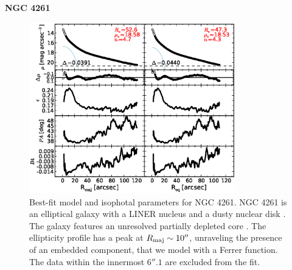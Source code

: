 \documentclass[preprint2]{emulateapj}
\newcommand{\fitfigurewidth}{0.8\textwidth}
\begin{document}
  \clearpage\newpage\noindent
  {\bf NGC 4261 \\}

  \begin{figure}[h]
  \begin{center}
  \includegraphics[width=\fitfigurewidth]{images/n4261_1Dfit.eps}
  \caption{Best-fit model and isophotal parameters for NGC 4261.
  NGC 4261 is an elliptical galaxy with a LINER nucleus \citep{veroncettyveron2006}
  and a dusty nuclear disk \citep{tran2001}.
  The galaxy features an unresolved partially depleted core \citep{rusli2013}. %
  The ellipticity profile has a peak at $R_{\rm maj} \sim 10''$, unraveling the presence of an embedded component, 
  that we model with a Ferrer function.
  The data within the innermost $6''.1$ are excluded from the fit.
  }
  \end{center}
  \end{figure}
\end{document}
